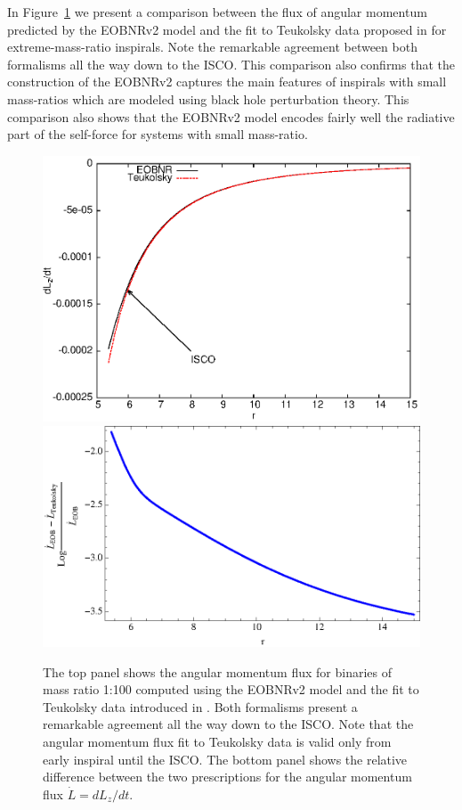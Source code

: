 In Figure~\ref{fluxfitheavy} we present a comparison between the flux of angular momentum predicted by the EOBNRv2 model and the fit to Teukolsky data proposed in \cite{improved} for extreme-mass-ratio inspirals. Note the remarkable agreement between both formalisms all the way down to the ISCO. This comparison also confirms that the construction of the EOBNRv2 captures the main features of inspirals with small mass-ratios which are modeled using black hole perturbation theory. This comparison also shows that the EOBNRv2 model encodes fairly well the radiative part of the self-force for systems with small mass-ratio. 


\begin{figure}%
\includegraphics[height=0.6\textwidth,  clip]{figures/insimri/TEOBLzdot}
\includegraphics[height=0.5\textwidth,  clip]{figures/insimri/teuvseobflux}
\caption{The top panel shows the angular momentum flux for binaries of mass ratio 1:100 computed using the EOBNRv2 model and the fit to Teukolsky data introduced in \cite{improved}. Both formalisms present a remarkable agreement all the way down to the ISCO. Note that the angular momentum flux fit to Teukolsky data is valid only from early inspiral until the ISCO. The bottom panel shows the relative difference between the two prescriptions for the angular momentum flux \(\dot{L}=dL_z/dt\).}
\label{fluxfitheavy}
\end{figure}


